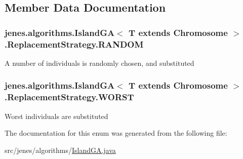 \subsection{Member Data Documentation}
\hypertarget{enumjenes_1_1algorithms_1_1_island_g_a_3_01_t_01extends_01_chromosome_01_4_1_1_replacement_strategy_a6025e6cfd088378ce15be8299d4d01a3}{
\subsubsection[{R\-A\-N\-D\-O\-M}]{\setlength{\rightskip}{0pt plus 5cm}jenes.\-algorithms.\-Island\-G\-A$<$ T extends Chromosome $>$.Replacement\-Strategy.\-R\-A\-N\-D\-O\-M}}\label{enumjenes_1_1algorithms_1_1_island_g_a_3_01_t_01extends_01_chromosome_01_4_1_1_replacement_strategy_a6025e6cfd088378ce15be8299d4d01a3}
A number of individuals is randomly chosen, and substituted \hypertarget{enumjenes_1_1algorithms_1_1_island_g_a_3_01_t_01extends_01_chromosome_01_4_1_1_replacement_strategy_a7c1f4683ed158cfaf0d6e21ce739bdea}{
\subsubsection[{W\-O\-R\-S\-T}]{\setlength{\rightskip}{0pt plus 5cm}jenes.\-algorithms.\-Island\-G\-A$<$ T extends Chromosome $>$.Replacement\-Strategy.\-W\-O\-R\-S\-T}}\label{enumjenes_1_1algorithms_1_1_island_g_a_3_01_t_01extends_01_chromosome_01_4_1_1_replacement_strategy_a7c1f4683ed158cfaf0d6e21ce739bdea}
Worst individuals are substituted 

The documentation for this enum was generated from the following file\-:\begin{DoxyCompactItemize}
\item 
src/jenes/algorithms/\hyperlink{_island_g_a_8java}{Island\-G\-A.\-java}\end{DoxyCompactItemize}

